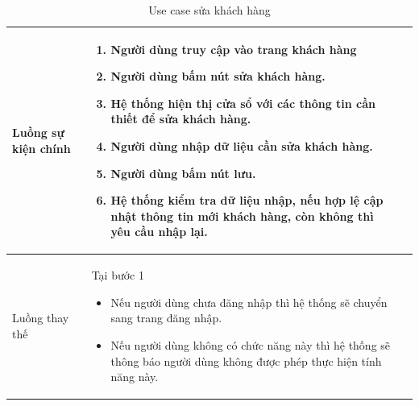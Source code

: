 \documentclass[12pt,a4paper]{article}
\begin{document}
\begin{table}[H]
\begin{tabular}{|p{3.5cm}|p{11.5cm}|c|}
            Luồng sự kiện chính & \vspace{-.8cm}\begin{enumerate}
                                                    \item Người dùng truy cập vào trang khách hàng
                                                    \item  Người dùng bấm nút sửa khách hàng.
                                                    \item  Hệ thống hiện thị cửa sổ với các thông tin cần thiết để sửa khách hàng.
                                                    \item  Người dùng nhập dữ liệu cần sửa khách hàng.
                                                    \item Người dùng bấm nút lưu.
                                                    \item Hệ thống kiểm tra dữ liệu nhập, nếu hợp lệ cập nhật thông tin mới khách hàng, còn không thì yêu cầu nhập lại.
            \end{enumerate}
            \\
            \hline
            Luồng thay thế & Tại bước 1\newline
            \vspace{-.8cm}\begin{itemize}
                              \item Nếu người dùng chưa đăng nhập thì hệ thống sẽ chuyển sang trang đăng nhập.
                              \item  Nếu người dùng không có chức năng này thì hệ thống sẽ thông báo người dùng không được phép thực hiện tính năng này.
            \end{itemize}
            \\
            \hline
        \end{tabular}
        \caption{Use case sửa khách hàng }
    \end{table}


\end{document}
